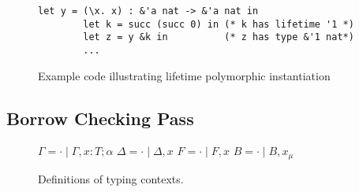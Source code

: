 \documentclass[letterpaper,11pt]{article}
\begin{document}
\begin{figure}[h]
    \begin{lstlisting}[language=caml]
        let y = (\x. x) : &'a nat -> &'a nat in 
        let k = succ (succ 0) in (* k has lifetime '1 *)
        let z = y &k in          (* z has type &'1 nat*)
        ...
    \end{lstlisting}

    \caption{Example code illustrating lifetime polymorphic instantiation}
    \label{lifetimepoly}
\end{figure}

\subsection{Borrow Checking Pass}

\begin{figure}
    \begin{center}
        $\Gamma = \cdot \mid \Gamma, x : T ; \alpha$ \quad
        $\Delta = \cdot \mid \Delta, x$ \quad
        $F = \cdot \mid F, x$ \quad
        $B = \cdot \mid B, x_{\mu}$
        
        \caption{Definitions of typing contexts.}
        \label{contexts}
    \end{center}
\end{figure}
\end{document}

